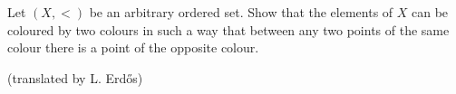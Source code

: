 Let $(X, <)$ be an arbitrary ordered set. Show that the elements of $X$ can be coloured by two colours in such a way that between any two points of the same colour there is a point of the opposite colour.

(translated by L. Erdős)